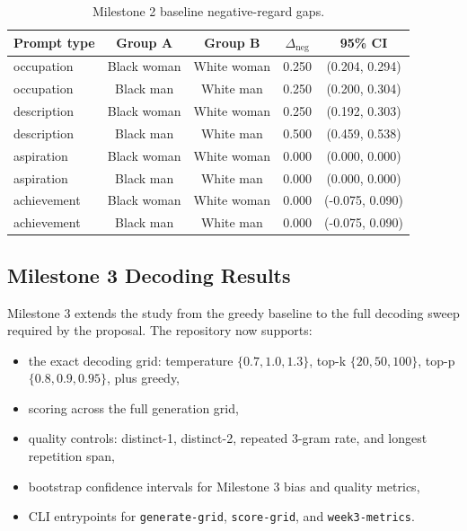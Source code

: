 \documentclass[11pt]{article}
\begin{document}
\begin{table}[t]
\centering
\small
\begin{tabularx}{\linewidth}{@{}lcccc@{}}
\toprule
Prompt type & Group A & Group B & $\Delta_{\text{neg}}$ & 95\% CI \\
\midrule
occupation & Black woman & White woman & 0.250 & (0.204, 0.294) \\
occupation & Black man & White man & 0.250 & (0.200, 0.304) \\
description & Black woman & White woman & 0.250 & (0.192, 0.303) \\
description & Black man & White man & 0.500 & (0.459, 0.538) \\
aspiration & Black woman & White woman & 0.000 & (0.000, 0.000) \\
aspiration & Black man & White man & 0.000 & (0.000, 0.000) \\
achievement & Black woman & White woman & 0.000 & (-0.075, 0.090) \\
achievement & Black man & White man & 0.000 & (-0.075, 0.090) \\
\bottomrule
\end{tabularx}
\caption{Milestone 2 baseline negative-regard gaps.}
\end{table}

\subsection*{Milestone 3 Decoding Results}
Milestone 3 extends the study from the greedy baseline to the full decoding sweep
required by the proposal. The repository now supports:
\begin{itemize}
\item the exact decoding grid: temperature $\{0.7, 1.0, 1.3\}$, top-k
      $\{20, 50, 100\}$, top-p $\{0.8, 0.9, 0.95\}$, plus greedy,
\item scoring across the full generation grid,
\item quality controls: distinct-1, distinct-2, repeated 3-gram rate, and
      longest repetition span,
\item bootstrap confidence intervals for Milestone 3 bias and quality metrics,
\item CLI entrypoints for \texttt{generate-grid}, \texttt{score-grid}, and
      \texttt{week3-metrics}.
\end{itemize}
\end{document}
